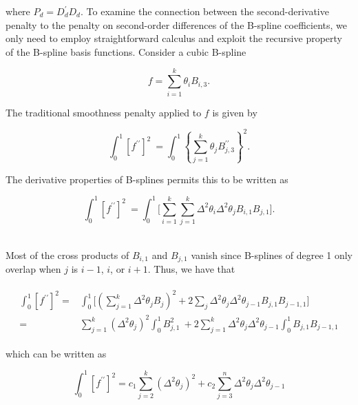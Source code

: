 \noindent
where $P_d = D_d^\prime D_d$.  To examine the connection between the second-derivative penalty to the penalty on second-order differences of the B-spline coefficients, we only need to employ straightforward calculus and exploit the recursive property of the B-spline basis functions. Consider a cubic B-spline 

\[
f = \sum_{i = 1}^k \theta_i B_{i,3}.
\]


The traditional smoothness penalty applied to $f$ is given by

\begin{equation*} 
\int_0^1 \left[ f^{\prime \prime}\right]^2\ = \int_{0}^{1} \left\{ \sum\limits_{j=1}^k  \theta_j B_{j,3}^{\prime \prime} \right\}^2.
\end{equation*}

\noindent
The derivative properties of B-splines permits this to be written as 

\begin{equation*} \label{eq:second-derivative-bspline-penalty}
\int_0^1 \left[ f^{\prime \prime}\right]^2\ =  \int_{0}^{1}  \bigg[ \sum\limits_{i=1}^k \sum\limits_{j=1}^k \Delta^2 \theta_i \Delta^2 \theta_j B_{i,1}B_{j,1}\bigg]. 
\end{equation*}

\noindent
\\
Most of the cross products of $B_{i,1}$ and $B_{j,1}$ vanish since B-splines of degree 1 only overlap when $j$ is $i-1$, $i$, or $i+1$. Thus, we have that

\begin{align}
\begin{split}
\int_0^1 \left[ f^{\prime \prime}\right]^2  = {} &  \int_0^1 \bigg[ \left( \sum\limits_{j=1}^k   \Delta^2 \theta_j  B_j \right)^2  + 2 \sum_{j}\Delta^2 \theta_j\Delta^2 \theta_{j-1}B_{j,1}B_{j-1,1} \bigg]\\ 
= {} & \sum \limits_{j=1}^k  \left( \Delta^2\theta_j \right)^2 \int_0^1 B_{j,1}^2\ + 2 \sum\limits_{j=1}^k \Delta^2 \theta_j\Delta^2 \theta_{j-1} \int_0^1 B_{j,1}B_{j-1,1} 
\end{split}
\end{align}

\noindent
which can be written as

\begin{equation} \label{eq:derivative-penalty-difference-penalty-connection}
\int_0^1 \left[ f^{\prime \prime}\right]^2  = c_1 \sum\limits_{j=2}^k \left( \Delta^2 \theta_j\right)^2 + c_2 \sum\limits_{j=3}^n \Delta^2 \theta_j\Delta^2 \theta_{j-1}
\end{equation}

